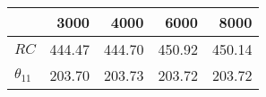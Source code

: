 \begin{tabular}{lrrrr}
\toprule
{} &    3000 &    4000 &    6000 &    8000 \\
\midrule
$RC$          &  444.47 &  444.70 &  450.92 &  450.14 \\
$\theta_{11}$ &  203.70 &  203.73 &  203.72 &  203.72 \\
\bottomrule
\end{tabular}
